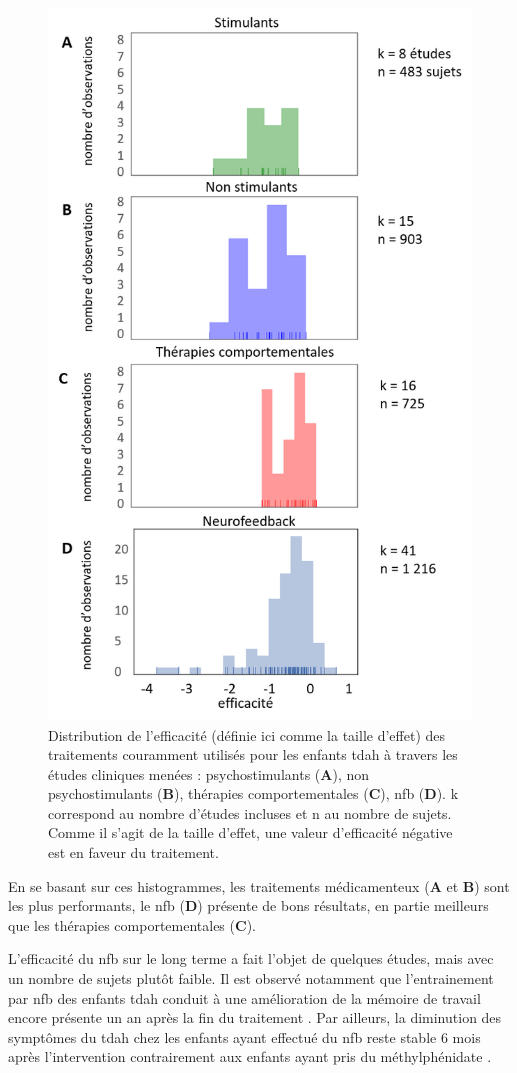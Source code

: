 \begin{figure}[h!]
  \centering
	\includegraphics[width=0.5\linewidth]{figures/chapter-1/introduction-efficacy-treatments} 
  \caption{Distribution de l'efficacité (définie ici comme la taille d'effet) des traitements couramment utilisés pour les enfants \gls{tdah} à travers les études cliniques menées : 
	psychostimulants (\textbf{A}), non psychostimulants (\textbf{B}), thérapies comportementales (\textbf{C}), \gls{nfb} (\textbf{D}). k correspond au nombre
	d'études incluses et n au nombre de sujets. 
	Comme il s'agit de la taille d'effet, une valeur d'efficacité négative est en faveur du traitement.}
  \label{Figure:introduction-efficacy-treatments}
\end{figure}

En se basant sur ces histogrammes, les traitements médicamenteux (\textbf{A} et \textbf{B}) sont les plus performants, le \gls{nfb} (\textbf{D}) présente de bons
résultats, en partie meilleurs que les thérapies comportementales (\textbf{C}). 

L'efficacité du \gls{nfb} sur le long terme a fait l'objet de quelques études, mais avec un nombre de sujets plutôt faible. Il est observé notamment
que l'entrainement par \gls{nfb} des enfants \gls{tdah} conduit à une amélioration de la mémoire de travail encore présente un an après la fin du traitement
\citep{Dobrakowski2019}. Par ailleurs, la diminution des symptômes du \gls{tdah} chez les enfants ayant effectué du \gls{nfb} reste stable 6 mois après 
l'intervention contrairement aux enfants ayant pris du méthylphénidate \citep{Gelade2018}. 

